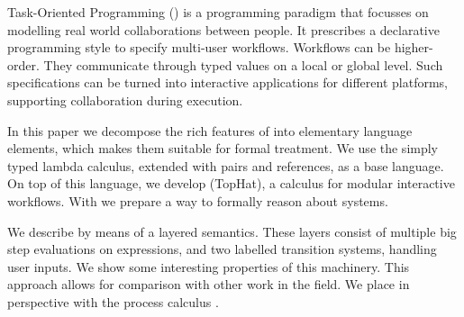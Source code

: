 
Task-Oriented Programming (\TOP) is a programming paradigm that focusses on modelling real world collaborations between people.
It prescribes a declarative programming style to specify multi-user workflows.
Workflows can be higher-order.
They communicate through typed values on a local or global level.
Such specifications can be turned into interactive applications for different platforms,
supporting collaboration during execution.

In this paper we decompose the rich features of \TOP into elementary language elements,
which makes them suitable for formal treatment.
We use the simply typed lambda calculus, extended with pairs and references, as a base language.
On top of this language, we develop \TOPHAT (TopHat), a calculus for modular interactive workflows.
With \TOPHAT we prepare a way to formally reason about \TOP systems.

We describe \TOPHAT by means of a layered semantics.
These layers consist of multiple big step evaluations on expressions,
and two labelled transition systems, handling user inputs.
We show some interesting properties of this machinery.
This approach allows for comparison with other work in the field.
We place \TOPHAT in perspective with the process calculus \CSP.
